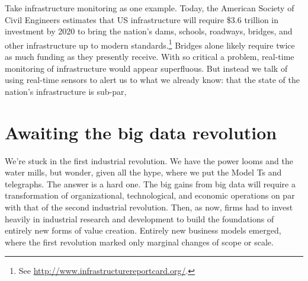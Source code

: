 \documentclass[12pt]{article}
\begin{document}
Take infrastructure monitoring as one example. Today, the American
Society of Civil Engineers estimates that US infrastructure will
require \$3.6 trillion in investment by 2020 to bring the nation's
dams, schools, roadways, bridges, and other infrastructure up to
modern standards.\footnote{See
  \url{http://www.infrastructurereportcard.org/}.} Bridges alone
likely require twice as much funding as they presently receive. With
so critical a problem, real-time monitoring of infrastructure would
appear superfluous. But instead we talk of using real-time sensors to
alert us to what we already know: that the state of the nation's
infrastructure is sub-par, 






\section{Awaiting the big data revolution}
\label{sec:awaiting-big-data}

We're stuck in the first industrial revolution. We have the power
looms and the water mills, but wonder, given all the hype, where we put the Model Ts and
telegraphs. The answer is a hard one. The big gains from big data will
require a transformation of organizational, technological, and
economic operations on par with that of the second industrial
revolution. Then, as now, firms had to invest heavily in industrial
research and development to build the foundations of entirely new
forms of value creation. Entirely new business models emerged, where
the first revolution marked only marginal changes of scope or scale. 
\end{document}
